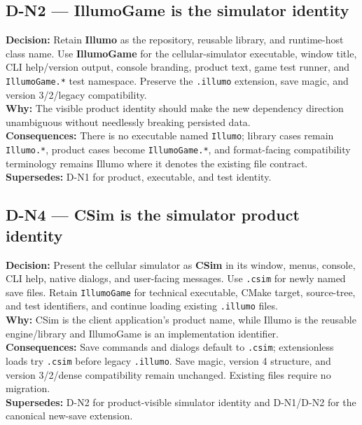 \subsection*{D-N2 --- IllumoGame is the simulator identity}
\begin{decisionbox}[title={D-N2 \quad 2026-08-18}]
\textbf{Decision:} Retain \textbf{Illumo} as the repository, reusable library,
and runtime-host class name. Use \textbf{IllumoGame} for the cellular-simulator
executable, window title, CLI help/version output, console branding, product
text, game test runner, and \texttt{IllumoGame.*} test namespace. Preserve the
\texttt{.illumo} extension, save magic, and version 3/2/legacy compatibility.\\
\textbf{Why:} The visible product identity should make the new dependency
direction unambiguous without needlessly breaking persisted data.\\
\textbf{Consequences:} There is no executable named \texttt{Illumo}; library
cases remain \texttt{Illumo.*}, product cases become \texttt{IllumoGame.*}, and
format-facing compatibility terminology remains Illumo where it denotes the
existing file contract.\\
\textbf{Supersedes:} D-N1 for product, executable, and test identity.
\end{decisionbox}

\subsection*{D-N4 --- CSim is the simulator product identity}
\begin{decisionbox}[title={D-N4 \quad 2026-09-16}]
\textbf{Decision:} Present the cellular simulator as \textbf{CSim} in its
window, menus, console, CLI help, native dialogs, and user-facing messages.
Use \texttt{.csim} for newly named save files. Retain \texttt{IllumoGame} for
technical executable, CMake target, source-tree, and test identifiers, and
continue loading existing \texttt{.illumo} files.\\
\textbf{Why:} CSim is the client application's product name, while Illumo is
the reusable engine/library and IllumoGame is an implementation identifier.\\
\textbf{Consequences:} Save commands and dialogs default to \texttt{.csim};
extensionless loads try \texttt{.csim} before legacy \texttt{.illumo}. Save
magic, version 4 structure, and version 3/2/dense compatibility remain
unchanged. Existing files require no migration.\\
\textbf{Supersedes:} D-N2 for product-visible simulator identity and D-N1/D-N2
for the canonical new-save extension.
\end{decisionbox}

